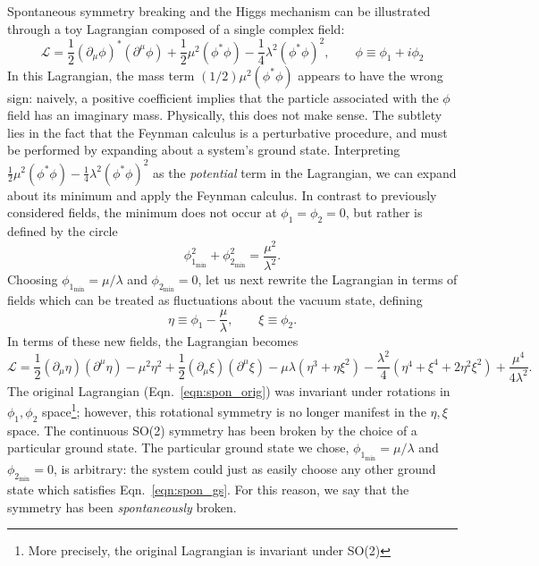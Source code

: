 Spontaneous symmetry breaking and the Higgs mechanism can be illustrated through a toy Lagrangian composed of a single complex field:
\begin{equation} \label{eqn:spon_orig}
    \mathcal L = \frac{1}{2} (\partial_\mu \phi)^*(\partial^\mu \phi) + \frac{1}{2} \mu^2 (\phi^* \phi) - \frac{1}{4} \lambda^2 (\phi^* \phi)^2, \qquad \phi \equiv \phi_1 + i \phi_2
\end{equation}
In this Lagrangian, the mass term $(1/2) \mu^2 (\phi^* \phi)$ appears to have the wrong sign: naively, a positive coefficient implies that the particle associated with the $\phi$ field has an imaginary mass.
Physically, this does not make sense.
The subtlety lies in the fact that the Feynman calculus is a perturbative procedure, and must be performed by expanding about a system's ground state.
Interpreting $\frac{1}{2} \mu^2 (\phi^* \phi) - \frac{1}{4} \lambda^2 (\phi^* \phi)^2$ as the \emph{potential} term in the Lagrangian, we can expand about its minimum and apply the Feynman calculus.
In contrast to previously considered fields, the minimum does not occur at $\phi_1 = \phi_2 = 0$, but rather is defined by the circle
\begin{equation} \label{eqn:spon_gs}
    \phi_{1_{\text{min}}}^2 + \phi_{2_{\text{min}}}^2 = \frac{\mu^2}{\lambda^2}.
\end{equation}
Choosing $\phi_{1_{\text{min}}} = \mu/\lambda$ and $\phi_{2_{\text{min}}} = 0$, let us next rewrite the Lagrangian in terms of fields which can be treated as fluctuations about the vacuum state, defining
\begin{equation} \label{eqn:spon_gs}
    \eta \equiv \phi_1 - \frac{\mu}{\lambda}, \qquad \xi \equiv \phi_2.
\end{equation}
In terms of these new fields, the Lagrangian becomes
\begin{equation} \label{eqn:spon_transf}
    \mathcal L = \frac{1}{2} (\partial_\mu \eta)(\partial^\mu \eta) - \mu^2 \eta^2 + \frac{1}{2} (\partial_\mu \xi)(\partial^\mu \xi) - \mu \lambda(\eta^3 + \eta \xi^2) - \frac{\lambda^2}{4}(\eta^4 + \xi^4 + 2 \eta^2 \xi^2) + \frac{\mu^4}{4 \lambda^2}.
\end{equation}
The original Lagrangian (Eqn.~\ref{eqn:spon_orig}) was invariant under rotations in $\phi_1, \phi_2$ space\footnote{More precisely, the original Lagrangian is invariant under SO(2)}; however, this rotational symmetry is no longer manifest in the $\eta, \xi$ space.
The continuous SO(2) symmetry has been broken by the choice of a particular ground state.
The particular ground state we chose, $\phi_{1_{\text{min}}} = \mu/\lambda$ and $\phi_{2_{\text{min}}} = 0$, is arbitrary: the system could just as easily choose any other ground state which satisfies Eqn.~\ref{eqn:spon_gs}.
For this reason, we say that the symmetry has been \emph{spontaneously} broken.

